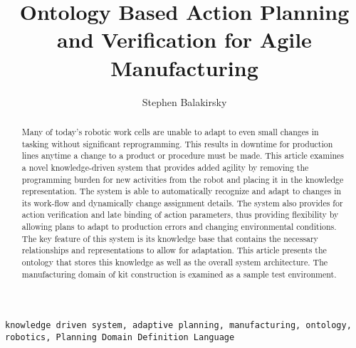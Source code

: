 \documentclass[review]{elsarticle}
\begin{document}
\begin{frontmatter}

\title{Ontology Based Action Planning and Verification for Agile Manufacturing}

\author{Stephen Balakirsky}
\address{Georgia Tech Research Institute, Atlanta, GA 30332, USA}

\begin{abstract}
Many of today's robotic work cells are unable to adapt to even small changes in tasking without significant reprogramming. 
This results in downtime for production
lines anytime a change to a product or procedure must be made. This article examines a novel 
knowledge-driven system that 
provides added agility by removing the programming burden for new activities from the robot 
and placing it in the knowledge representation. The system is able to automatically 
recognize and adapt to changes in its work-flow and dynamically change assignment details. 
The system also provides for 
action verification and
late binding of action parameters, 
thus providing flexibility by allowing plans 
to adapt to production errors and changing environmental conditions. The key feature of this system is its knowledge base that 
contains the necessary 
relationships and representations to allow for
adaptation. This article presents the ontology that stores this knowledge as well as the 
overall system architecture. 
The manufacturing domain of kit construction is examined as a sample test environment. 
\end{abstract}

\begin{keyword}
\texttt{knowledge driven system, adaptive planning, manufacturing, ontology, robotics, Planning Domain Definition Language}
\end{keyword}

\end{frontmatter}

\linenumbers

%
%
%
%





%
%



%
%
%

\end{document}
